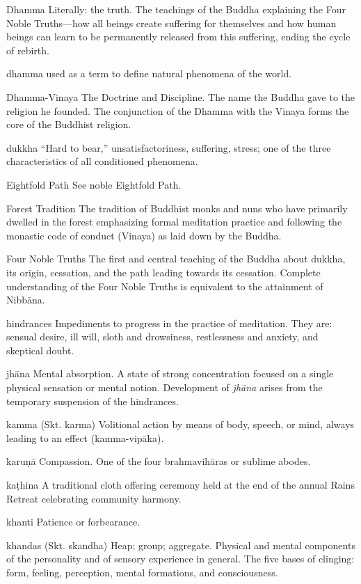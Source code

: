 Dhamma Literally: the truth. The teachings of the Buddha explaining the 
Four Noble Truths---how all beings create suffering for themselves and 
how human beings can learn to be permanently released from this 
suffering, ending the cycle of rebirth.

dhamma used as a term to define natural phenomena of the world.

Dhamma-Vinaya The Doctrine and Discipline. The name the Buddha gave to 
the religion he founded. The conjunction of the Dhamma with the Vinaya 
forms the core of the Buddhist religion.

dukkha ``Hard to bear,'' unsatisfactoriness, suffering, stress; one of 
the three characteristics of all conditioned phenomena.

Eightfold Path See noble Eightfold Path.

Forest Tradition The tradition of Buddhist monks and nuns who have 
primarily dwelled in the forest emphasizing formal meditation practice 
and following the monastic code of conduct (Vinaya) as laid down by the 
Buddha.

Four Noble Truths The first and central teaching of the Buddha about 
dukkha, its origin, cessation, and the path leading towards its 
cessation. Complete understanding of the Four Noble Truths is 
equivalent to the attainment of Nibbāna.

hindrances Impediments to progress in the practice of meditation. They 
are: sensual desire, ill will, sloth and drowsiness, restlessness and 
anxiety, and skeptical doubt.

jhāna Mental absorption. A state of strong concentration focused on a 
single physical sensation or mental notion. Development of 
\emph{jhāna} arises from the temporary suspension of the hindrances.

kamma (Skt. karma) Volitional action by means of body, speech, or mind, 
always leading to an effect (kamma-vipāka).

karuṇā Compassion. One of the four brahmavihāras or sublime abodes.

kaṭhina A traditional cloth offering ceremony held at the end of the 
annual Rains Retreat celebrating community harmony.

khanti Patience or forbearance.

khandas (Skt. skandha) Heap; group; aggregate. Physical and mental 
components of the personality and of sensory experience in general. The 
five bases of clinging: form, feeling, perception, mental formations, 
and consciousness.

